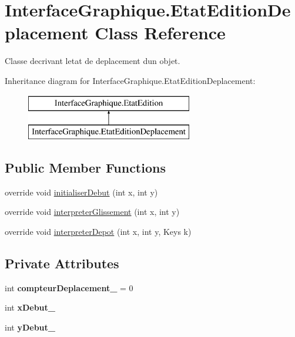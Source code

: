 \hypertarget{class_interface_graphique_1_1_etat_edition_deplacement}{}\section{Interface\+Graphique.\+Etat\+Edition\+Deplacement Class Reference}
\label{class_interface_graphique_1_1_etat_edition_deplacement}


Classe decrivant l\textquotesingle{}etat de deplacement d\textquotesingle{}un objet.  


Inheritance diagram for Interface\+Graphique.\+Etat\+Edition\+Deplacement\+:\begin{figure}[H]
\begin{center}
\leavevmode
\includegraphics[height=2.000000cm]{class_interface_graphique_1_1_etat_edition_deplacement}
\end{center}
\end{figure}
\subsection*{Public Member Functions}
\begin{DoxyCompactItemize}
\item 
override void \hyperlink{group__inf2990_gabc8016b3e2aa3cb05ab7ed46e09f9756}{initialiser\+Debut} (int x, int y)
\item 
override void \hyperlink{group__inf2990_ga7a539c405dacfc8c4db9236c3339ac78}{interpreter\+Glissement} (int x, int y)
\item 
override void \hyperlink{group__inf2990_gad7f3950cc5a7424a4202b13e2887ba98}{interpreter\+Depot} (int x, int y, Keys k)
\end{DoxyCompactItemize}
\subsection*{Private Attributes}
\begin{DoxyCompactItemize}
\item 
int {\bfseries compteur\+Deplacement\+\_\+} = 0
\item 
int {\bfseries x\+Debut\+\_\+}
\item 
int {\bfseries y\+Debut\+\_\+}
\end{DoxyCompactItemize}
